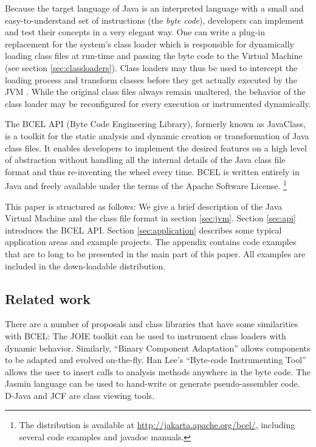\documentclass[12pt,twoside]{article}
\newcommand\jc{{\sffamily BCEL }}
\newcommand\jvm{{Java Virtual Machine }}
\newcommand\vm{{Virtual Machine }}
\begin{document}
Because the target language of  Java is an interpreted language with a
small  and  easy-to-understand  set  of instructions  (the  \emph{byte
code}), developers  can implement  and test their  concepts in  a very
elegant way.   One can  write a plug-in  replacement for  the system's
class loader which is  responsible for dynamically loading class files
at  run-time  and  passing the  byte  code  to  the \vm  (see  section
\ref{sec:classloaders}).  Class loaders may  thus be used to intercept
the  loading process and  transform classes  before they  get actually
executed  by the  JVM  \cite{classloader}.  While  the original  class
files always remain unaltered, the behavior of the class loader may be
reconfigured for every execution or instrumented dynamically.

The \jc API (Byte Code Engineering Library), formerly known as
JavaClass, is a toolkit for the static analysis and dynamic creation
or transformation of Java class files.  It enables developers to
implement the desired features on a high level of abstraction without
handling all the internal details of the Java class file format and
thus re-inventing the wheel every time.  \jc is written entirely in
Java and freely available under the terms of the Apache Software
License.  \footnote{The distribution is available at
  \url{http://jakarta.apache.org/bcel/}, including several code
  examples and javadoc manuals.  }

This paper is structured as follows:  We give a  brief description of
the \jvm and the class  file format in section \ref{sec:jvm}.  Section
\ref{sec:api} introduces  the \jc API.   Section \ref{sec:application}
describes  some typical  application areas  and example  projects. The
appendix contains  code examples that are  to long to  be presented in
the  main  part  of this  paper.  All  examples  are included  in  the
down-loadable distribution.

\subsection{Related work}

There are  a number  of proposals and  class libraries that  have some
similarities with \textsc{BCEL}: The JOIE \cite{joie} toolkit can
be used to instrument class loaders with dynamic behavior.  Similarly,
``Binary  Component Adaptation''  \cite{bca} allows  components  to be
adapted and  evolved on-the-fly.  Han  Lee's ``Byte-code Instrumenting
Tool'' \cite{bit} allows the user  to insert calls to analysis methods
anywhere in the  byte code.  The Jasmin language  \cite{jasmin} can be
used  to   hand-write  or  generate   pseudo-assembler  code.   D-Java
\cite{classfile} and JCF \cite{inside} are class viewing tools.
\end{document}
